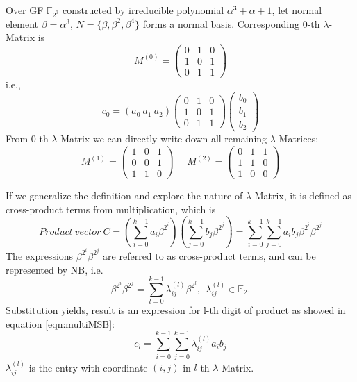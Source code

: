 \begin{Example}
Over GF $\mathbb F_{2^3}$ constructed by irreducible polynomial $\alpha^3 + \alpha + 1$, let normal element $\beta = \alpha^3$, $N = \{ \beta, \beta^2, \beta^4\}$ 
forms a normal basis. Corresponding $0$-th $\lambda$-Matrix is
\begin{equation*}
M^{(0)} = \left(
\begin{array} {lcr}
0 & 1 & 0\\
1 & 0 & 1\\
0 & 1 & 1
\end{array} \right)
\end{equation*}
i.e.,
\begin{equation*}
c_0 = (a_0\  a_1\  a_2)\left(
\begin{array} {lcr}
0 & 1 & 0\\
1 & 0 & 1\\
0 & 1 & 1
\end{array} \right)\left(
\begin{array} {lcr}
b_0\\
b_1\\
b_2
\end{array} \right)
\end{equation*}
From $0$-th $\lambda$-Matrix we can directly write down all remaining $\lambda$-Matrices:
\begin{equation*}
M^{(1)} = \left(
\begin{array} {lcr}
1 & 0 & 1\\
0 & 0 & 1\\
1 & 1 & 0
\end{array} \right)~~~~~~
M^{(2)} = \left(
\begin{array} {lcr}
0 & 1 & 1\\
1 & 1 & 0\\
1 & 0 & 0
\end{array} \right)
\end{equation*}
\end{Example}

If we generalize the definition and explore the nature of $\lambda$-Matrix, it is defined as cross-product terms from multiplication, which is 
\begin{equation}
Product~vector~C = (\sum_{i=0}^{k-1}a_i\beta^{2^i})(\sum_{j=0}^{k-1}b_j\beta^{2^j}) = \sum_{i=0}^{k-1}\sum_{j=0}^{k-1}a_ib_j\beta^{2^i}\beta^{2^j}
\end{equation}
The expressions $\beta^{2^i}\beta^{2^j}$ are referred to as cross-product terms, and can be represented by
NB, i.e.
\begin{equation}
\beta^{2^i}\beta^{2^j} = \sum_{l=0}^{k-1}\lambda_{ij}^{(l)}\beta^{2^l}, \ \ \lambda_{ij}^{(l)} \in \mathbb F_2.
\end{equation}
Substitution yields, result is an expression for l-th digit of product as showed in equation \ref{eqn:multiMSB}:
\begin{equation}
c_l = \sum_{i=0}^{k-1}\sum_{j=0}^{k-1}\lambda_{ij}^{(l)}a_ib_j
\end{equation}
$\lambda_{ij}^{(l)}$ is the entry with coordinate $(i,j)$ in $l$-th $\lambda$-Matrix.


